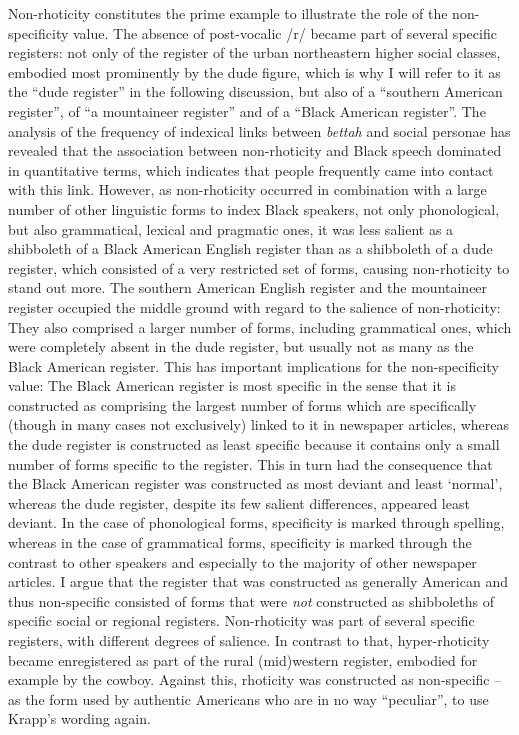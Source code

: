 Non-rhoticity constitutes the prime example to illustrate the role of the non-specificity value. The absence of post-vocalic /r/ became part of several specific registers: not only of the register of the urban northeastern higher social classes, embodied most prominently by the dude figure, which is why I will refer to it as the “dude register” in the following discussion, but also of a “southern American register”, of “a mountaineer register” and of a “Black American register”. The analysis of the frequency of indexical links between \emph{bettah} and social personae has revealed that the association between non-rhoticity and Black speech dominated in quantitative terms, which indicates that people frequently came into contact with this link. However, as non-rhoticity occurred in combination with a large number of other linguistic forms to index Black speakers, not only phonological, but also grammatical, lexical and pragmatic ones, it was less salient as a shibboleth of a Black American English register than as a shibboleth of a dude register, which consisted of a very restricted set of forms, causing non-rhoticity to stand out more. The southern American English register and the mountaineer register occupied the middle ground with regard to the salience of non-rhoticity: They also comprised a larger number of forms, including grammatical ones, which were completely absent in the dude register, but usually not as many as the Black American register. This has important implications for the non-specificity value: The Black American register is most specific in the sense that it is constructed as comprising the largest number of forms which are specifically (though in many cases not exclusively) linked to it in newspaper articles, whereas the dude register is constructed as least specific because it contains only a small number of forms specific to the register. This in turn had the consequence that the Black American register was constructed as most deviant and least ‘normal’, whereas the dude register, despite its few salient differences, appeared least deviant. In the case of phonological forms, specificity is marked through spelling, whereas in the case of grammatical forms, specificity is marked through the contrast to other speakers and especially to the majority of other newspaper articles. I argue that the register that was constructed as generally American and thus non-specific consisted of forms that were \emph{not} constructed as shibboleths of specific social or regional registers. Non-rhoticity was part of several specific registers, with different degrees of salience. In contrast to that, hyper-rhoticity became enregistered as part of the rural (mid)western register, embodied for example by the cowboy. Against this, rhoticity was  constructed as non-specific – as the form used by authentic Americans who are in no way “peculiar”, to use Krapp’s wording again.

